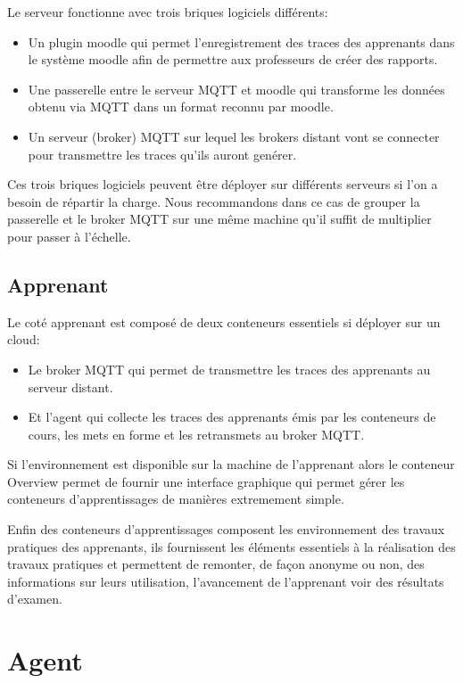 \documentclass[a4paper,11pt]{report}
\begin{document}
Le serveur fonctionne avec trois briques logiciels différents:

\begin{itemize}
  \item Un plugin moodle qui permet l'enregistrement des traces des apprenants dans le système moodle afin de permettre aux professeurs de créer des rapports.
  \item Une passerelle entre le serveur MQTT et moodle qui transforme les données obtenu via MQTT dans un format reconnu par moodle.
  \item Un serveur (broker) MQTT sur lequel les brokers distant vont se connecter pour transmettre les traces qu'ils auront genérer.
\end{itemize}

Ces trois briques logiciels peuvent être déployer sur différents serveurs si l'on a besoin de répartir la charge. Nous recommandons dans ce cas de grouper la passerelle et le broker MQTT sur une même machine qu'il suffit de multiplier pour passer à l'échelle.

\subsection{Apprenant}

Le coté apprenant est composé de deux conteneurs essentiels si déployer sur un cloud:

\begin{itemize}
  \item Le broker MQTT qui permet de transmettre les traces des apprenants au serveur distant.
  \item Et l'agent qui collecte les traces des apprenants émis par les conteneurs de cours, les mets en forme et les retransmets au broker MQTT.
\end{itemize}

Si l'environnement est disponible sur la machine de l'apprenant alors le conteneur Overview permet de fournir une interface graphique qui permet gérer les conteneurs d'apprentissages de manières extremement simple.

Enfin des conteneurs d'apprentissages composent les environnement des travaux pratiques des apprenants, ils fournissent les éléments essentiels à la réalisation des travaux pratiques et permettent de remonter, de façon anonyme ou non, des informations sur leurs utilisation, l'avancement de l'apprenant voir des résultats d'examen.

\section{Agent}
\end{document}
